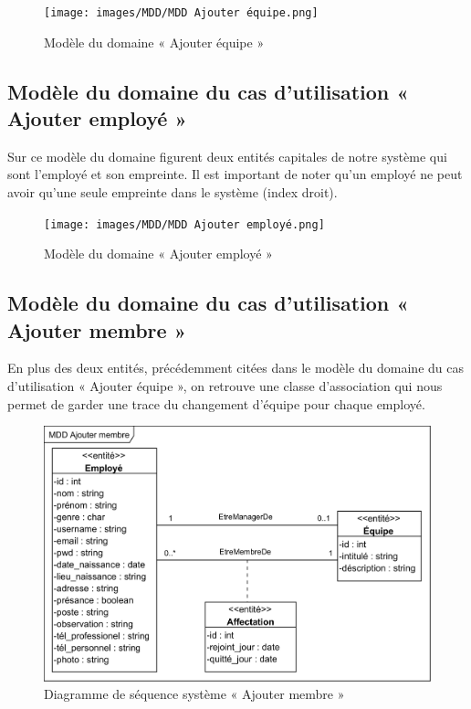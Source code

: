 \begin{figure}[h!]
    \centering
    \texttt{[image: images/MDD/MDD Ajouter équipe.png]}
    \caption{Modèle du domaine « Ajouter équipe »}
    \label{fig15}
\end{figure}
            
\subsection*{Modèle du domaine du cas d'utilisation « Ajouter employé »}
Sur ce modèle du domaine figurent deux entités capitales de notre système 
qui sont l’employé et son empreinte. Il est important de noter qu’un employé 
ne peut avoir qu’une seule empreinte dans le système (index droit).

\clearpage

\begin{figure}[h!]
    \centering
    \texttt{[image: images/MDD/MDD Ajouter employé.png]}
    \caption{Modèle du domaine « Ajouter employé »}
    \label{fig16}
\end{figure}
            
\subsection*{Modèle du domaine du cas d'utilisation « Ajouter membre »}
En plus des deux entités, précédemment citées dans le modèle du domaine du cas 
d’utilisation « Ajouter équipe », on retrouve une classe d’association qui 
nous permet de garder une trace du changement d’équipe pour chaque employé.

\clearpage

\begin{figure}[h!]
	\centering
	\includegraphics[scale=1.22]{images/MDD/MDD Ajouter membre.png}
	\caption{Diagramme de séquence système « Ajouter membre »}
	\label{fig17}
\end{figure}


